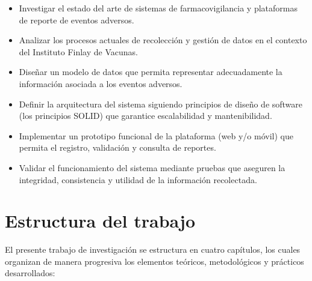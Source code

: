 \begin{itemize}
    \item Investigar el estado del arte de sistemas de farmacovigilancia y plataformas de reporte de eventos adversos.
    
    \item Analizar los procesos actuales de recolección y gestión de datos en el contexto del Instituto Finlay de Vacunas.
    
    \item Diseñar un modelo de datos que permita representar adecuadamente la información asociada a los eventos adversos.
    
    \item Definir la arquitectura del sistema siguiendo principios de diseño de software (los principios SOLID) que garantice escalabilidad y mantenibilidad.
    
    \item Implementar un prototipo funcional de la plataforma (web y/o móvil) que permita el registro, validación y consulta de reportes.
    
    \item Validar el funcionamiento del sistema mediante pruebas que aseguren la integridad, consistencia y utilidad de la información recolectada.
\end{itemize}

\section{Estructura del trabajo}\label{section:estructuraTrabajo}

El presente trabajo de investigación se estructura en cuatro capítulos, los cuales organizan de manera progresiva los elementos teóricos, metodológicos y prácticos desarrollados:

